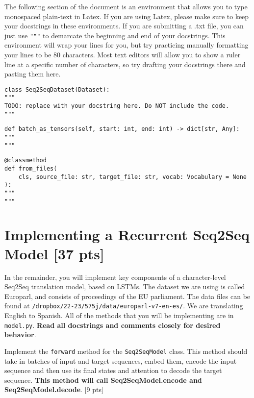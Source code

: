 \documentclass[11pt]{article}
\begin{document}
The following section of the document is an environment that allows you to type monospaced plain-text in Latex. If you are using Latex, please make sure to keep your docstrings in these environments. If you are submitting a .txt file, you can just use \texttt{"""} to demarcate the beginning and end of your docstrings. This environment will wrap your lines for you, but try practicing manually formatting your lines to be 80 characters. Most text editors will allow you to show a ruler line at a specific number of characters, so try drafting your docstrings there and pasting them here.

\begin{lstlisting}
class Seq2SeqDataset(Dataset):
"""
TODO: replace with your docstring here. Do NOT include the code.
"""
\end{lstlisting}

\begin{lstlisting}
def batch_as_tensors(self, start: int, end: int) -> dict[str, Any]:
"""
"""
\end{lstlisting}

\begin{lstlisting}
@classmethod
def from_files(
    cls, source_file: str, target_file: str, vocab: Vocabulary = None
):
"""
"""
\end{lstlisting}

\section{Implementing a Recurrent Seq2Seq Model [37 pts]}

In the remainder, you will implement key components of a character-level Seq2Seq translation model, based on LSTMs. The dataset we are using is called Europarl, and consists of proceedings of the EU parliament. The data files can be found at \texttt{/dropbox/22-23/575j/data/europarl-v7-en-es/}. We are translating English to Spanish. All of the methods that you will be implementing are in \texttt{model.py}. \textbf{Read all docstrings and comments closely for desired behavior}.

\vspace{2em}
 Implement the \texttt{forward} method for the \texttt{Seq2SeqModel} class. This method should take in batches of input and target sequences, embed them, encode the input sequence and then use its final states and attention to decode the target sequence. \textbf{This method will call Seq2SeqModel.encode and Seq2SeqModel.decode}. \hfill [9 pts]
\end{document}
